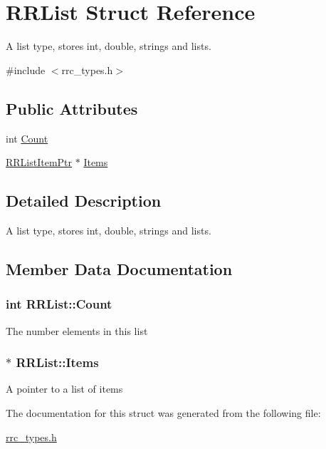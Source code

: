 \hypertarget{struct_r_r_list}{}\section{R\+R\+List Struct Reference}
\label{struct_r_r_list}


A list type, stores int, double, strings and lists.  




{\ttfamily \#include $<$rrc\+\_\+types.\+h$>$}

\subsection*{Public Attributes}
\begin{DoxyCompactItemize}
\item 
int \hyperlink{struct_r_r_list_a7026370b1982636d3dbba185f94eab12}{Count}
\item 
\hyperlink{rrc__types_8h_a79938364b69256c42480bb3a29ebf73e}{R\+R\+List\+Item\+Ptr} $\ast$ \hyperlink{struct_r_r_list_a3ab34807b735e2b319a6b4c5a09854dd}{Items}
\end{DoxyCompactItemize}


\subsection{Detailed Description}
A list type, stores int, double, strings and lists. 

\subsection{Member Data Documentation}
\hypertarget{struct_r_r_list_a7026370b1982636d3dbba185f94eab12}{}
\subsubsection[{Count}]{\setlength{\rightskip}{0pt plus 5cm}int R\+R\+List\+::\+Count}\label{struct_r_r_list_a7026370b1982636d3dbba185f94eab12}
The number elements in this list \hypertarget{struct_r_r_list_a3ab34807b735e2b319a6b4c5a09854dd}{}
\subsubsection[{Items}]{$\ast$ R\+R\+List\+::\+Items}\label{struct_r_r_list_a3ab34807b735e2b319a6b4c5a09854dd}
A pointer to a list of items 

The documentation for this struct was generated from the following file\+:\begin{DoxyCompactItemize}
\item 
\hyperlink{rrc__types_8h}{rrc\+\_\+types.\+h}\end{DoxyCompactItemize}
